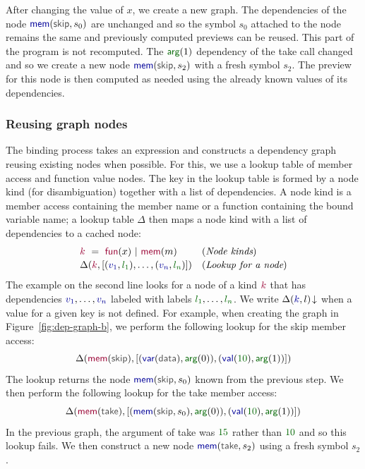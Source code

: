 \documentclass[acmsmall,anonymous,fleqn]{acmart}\settopmatter{printfolios=false,printccs=false,printacmref=false}
\theoremstyle{plain}
\theoremstyle{definition}
\newcommand{\num}[1]{\textcolor{numclr}{#1}}
\newcommand{\ident}[1]{\textnormal{\textcolor{idclr}{\sffamily #1}}}
\newcommand{\bndclr}[1]{\textcolor{kvdclr}{#1}}
\newcommand{\bkndclr}[1]{\textcolor{prepclr}{#1}}
\newcommand{\blblclr}[1]{\textcolor{numclr}{#1}}
\newcommand{\bnd}[1]{\textnormal{\textcolor{kvdclr}{\sffamily #1}}}
\newcommand{\bknd}[1]{\textnormal{\textcolor{prepclr}{\sffamily #1}}}
\newcommand{\blbl}[1]{\textnormal{\textcolor{numclr}{\sffamily #1}}}
\begin{document}
After changing the value of $x$, we create a new graph. The dependencies of the node
$\bnd{mem}(\ident{skip}, s_0)$ are unchanged and so the symbol $s_0$ attached to the node remains
the same and previously computed previews can be reused. This part of the program is not recomputed.
The $\blbl{arg}(1)$ dependency of the \ident{take} call
changed and so we create a new node $\bnd{mem}(\ident{skip}, s_2)$ with a fresh symbol $s_2$.
The preview for this node is then computed as needed using the already known values of its
dependencies.


\subsubsection{Reusing graph nodes}
The binding process takes an expression and constructs a dependency graph reusing existing nodes
when possible. For this, we use a lookup table of member access and function value nodes. The key
in the lookup table is formed by a node kind (for disambiguation) together with a list of
dependencies. A node kind is a member access containing the member name or a function containing
the bound variable name; a lookup table $\Delta$ then maps a node kind with a list of dependencies
to a cached node:
%
\begin{equation*}
\begin{array}{ll}
\bkndclr{k}~=~\bknd{fun}(x)~|~\bknd{mem}(m)&(\textit{Node kinds})\\[0.2em]
\Delta(\bkndclr{k}, [(\bndclr{v_1},\blblclr{l_1}), \ldots, (\bndclr{v_n},\blblclr{l_n})])  & (\textit{Lookup for a node})
\end{array}
\end{equation*}
%
The example on the second line looks for a node of a kind $\bkndclr{k}$ that has dependencies
$\bndclr{v_1}, \ldots, \bndclr{v_n}$ labeled with labels $\blblclr{l_1}, \ldots, \blblclr{l_n}$.
We write $\Delta(\bndclr{k}, l)\!\downarrow$ when a value for a given key is not defined.
For example, when creating the graph in Figure~\ref{fig:dep-graph-b},
we perform the following lookup for the \ident{skip} member access:
%
\[ \Delta(\bknd{mem}(\ident{skip}), [(\bnd{var}(\ident{data}),\blbl{arg}(0)), (\bnd{val}(\num{10}), \blbl{arg}(1))]) \]
%
The lookup returns the node $\bnd{mem}(\ident{skip}, s_0)$ known from the previous step. We then perform
the following lookup for the \ident{take} member access:
%
\[ \Delta(\bknd{mem}(\ident{take}), [(\bnd{mem}(\ident{skip}, s_0),\blbl{arg}(0)), (\bnd{val}(\num{10}), \blbl{arg}(1))]) \]
%
In the previous graph, the argument of \ident{take} was $\num{15}$ rather than $\num{10}$ and so
this lookup fails. We then construct a new node $\bnd{mem}(\ident{take}, s_2)$ using a fresh
symbol $s_2$.
\end{document}
